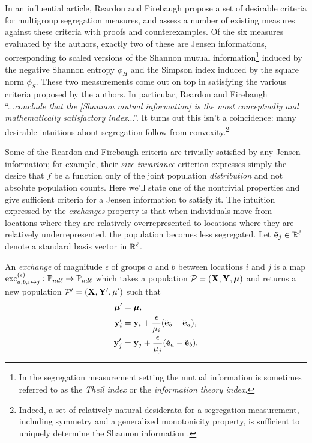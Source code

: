 In an influential article, Reardon and Firebaugh \cite{reardonMeasuresMultigroupSegregation2002} propose a set of desirable criteria for multigroup segregation measures, and assess a number of existing measures against these criteria with proofs and counterexamples.
Of the six measures evaluated by the authors, exactly two of these are Jensen informations, corresponding to scaled versions of the Shannon mutual information\footnote{In the segregation measurement setting the mutual information is sometimes referred to as the \emph{Theil index} or the \emph{information theory index}.} induced by the negative Shannon entropy $\phi_H$ and the Simpson index induced by the square norm $\phi_S$.
These two measurements come out on top in satisfying the various criteria proposed by the authors.
In particular, Reardon and Firebaugh ``...\emph{conclude that the [Shannon mutual information] is the most conceptually and mathematically satisfactory index}...''. 
It turns out this isn't a coincidence: many desirable intuitions about segregation follow from convexity.\footnote{Indeed, a set of relatively natural desiderata for a segregation measurement, including symmetry and a generalized monotonicity property, is sufficient to uniquely determine the Shannon information \cite{frankelMeasuringSchoolSegregation2011}.} 

Some of the Reardon and Firebaugh criteria are trivially satisfied by any Jensen information; for example, their \emph{size invariance} criterion expresses simply the desire that $f$ be a function only of the joint population \emph{distribution} and not absolute population counts. 
Here we'll state one of the nontrivial properties and give sufficient criteria for a Jensen information to satisfy it.
The intuition expressed by the \emph{exchanges} property is that when individuals move from locations where they are relatively overrepresented to locations where they are relatively underrepresented, the population becomes less segregated.
Let $\tilde{\mathbf{e}}_j \in \mathbb{R}^{\ell}$ denote a standard basis vector in $\mathbb{R}^{\ell}$. 

\begin{dfn}
  An \emph{exchange} of magnitude $\epsilon$ of groups $a$ and $b$ between locations $i$ and $j$ is a map $\mathrm{exc}_{a,b, i\leftrightarrow j}^{(\epsilon)}: \mathbb{P}_{nd\ell} \rightarrow \mathbb{P}_{nd\ell}$ which takes a population $\mathcal{P} = (\mathbf{X}, \mathbf{Y}, \boldsymbol{\mu})$ and returns a new population $\mathcal{P}' = (\mathbf{X}, \mathbf{Y}', \mu')$ such that
  \begin{align*}
    \boldsymbol{\mu}'  &= \boldsymbol{\mu}, \\ 
    \mathbf{y}_i' &= \mathbf{y}_i + \frac{\epsilon}{\mu_i} (\tilde{\mathbf{e}}_b - \tilde{\mathbf{e}}_a), \\
    \mathbf{y}_j' &= \mathbf{y}_j + \frac{\epsilon}{\mu_j} (\tilde{\mathbf{e}}_a - \tilde{\mathbf{e}}_b). 
  \end{align*}
\end{dfn}


